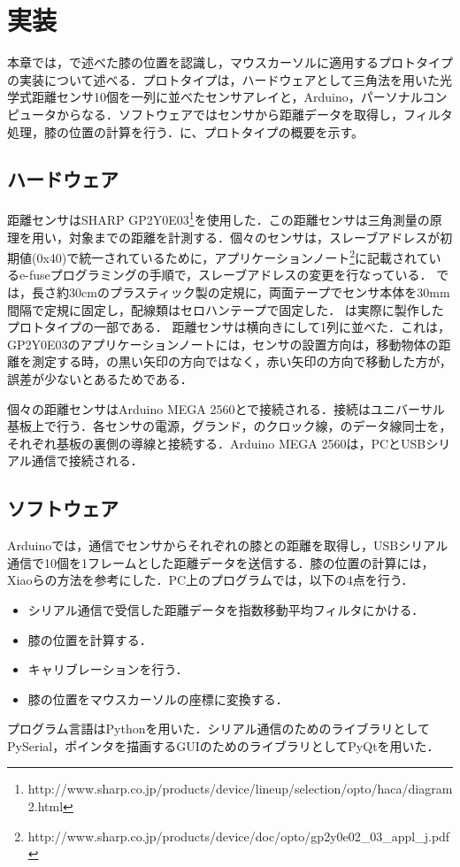 \chapter{実装}

本章では，で述べた膝の位置を認識し，マウスカーソルに適用するプロトタイプの実装について述べる．プロトタイプは，ハードウェアとして三角法を用いた光学式距離センサ10個を一列に並べたセンサアレイと，Arduino，パーソナルコンピュータからなる．ソフトウェアではセンサから距離データを取得し，フィルタ処理，膝の位置の計算を行う．に、プロトタイプの概要を示す。

\section{ハードウェア}
距離センサはSHARP GP2Y0E03\footnote{http://www.sharp.co.jp/products/device/lineup/selection/opto/haca/diagram2.html}を使用した．この距離センサは三角測量の原理を用い，対象までの距離を計測する．個々のセンサは，スレーブアドレスが初期値(0x40)で統一されているために，アプリケーションノート\footnote{http://www.sharp.co.jp/products/device/doc/opto/gp2y0e02\_03\_appl\_j.pdf}に記載されているe-fuseプログラミングの手順で，スレーブアドレスの変更を行なっている．
\SysName では，長さ約30\si{cm}のプラスティック製の定規に，両面テープでセンサ本体を30\si{mm}間隔で定規に固定し，配線類はセロハンテープで固定した．
は実際に製作したプロトタイプの一部である．
距離センサは横向きにして1列に並べた．これは，GP2Y0E03のアプリケーションノートには，センサの設置方向は，移動物体の距離を測定する時，の黒い矢印の方向ではなく，赤い矢印の方向で移動した方が，誤差が少ないとあるためである．
\par
個々の距離センサはArduino MEGA 2560と\iic で接続される．接続はユニバーサル基板上で行う．各センサの電源，グランド，\iic のクロック線，\iic のデータ線同士を，それぞれ基板の裏側の導線と接続する．Arduino MEGA 2560は，PCとUSBシリアル通信で接続される．

\section{ソフトウェア} 
Arduinoでは，\iic 通信でセンサからそれぞれの膝との距離を取得し，USBシリアル通信で10個を1フレームとした距離データを送信する．膝の位置の計算には，
Xiaoら\cite{Xiao:2018:LOP:3173574.3173669}の方法を参考にした．PC上のプログラムでは，以下の4点を行う．
\begin{itemize}
	\item シリアル通信で受信した距離データを指数移動平均フィルタにかける．
	\item 膝の位置を計算する．
	\item キャリブレーションを行う．
	\item 膝の位置をマウスカーソルの座標に変換する．
\end{itemize}
プログラム言語はPythonを用いた．シリアル通信のためのライブラリとしてPySerial，ポインタを描画するGUIのためのライブラリとしてPyQtを用いた．

